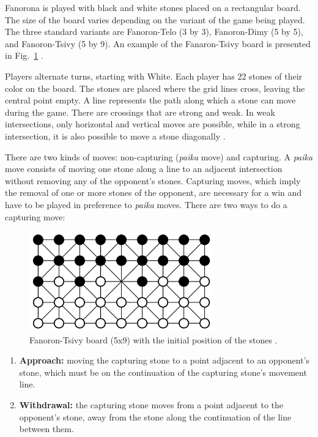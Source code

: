\documentclass[journal]{IEEEtran}
\begin{document}

Fanorona is played with black and white stones placed on a rectangular board. The size of the board varies depending on the variant of the game being played. The three standard variants are Fanoron-Telo (3 by 3), Fanoron-Dimy (5 by 5), and Fanoron-Tsivy (5 by 9). An example of the Fanaron-Tsivy board is presented in Fig.~\ref{fig:9x5Fano} \cite{walker2014book}. 

Players alternate turns, starting with White. Each player has 22 stones of their color on the board. The stones are placed where the grid lines cross, leaving the central point empty. A line represents the path along which a stone can move during the game. There are crossings that are strong and weak. In weak intersections, only horizontal and vertical moves are possible, while in a strong intersection, it is also possible to move a stone diagonally \cite{walker2014book, Schadd2008}. 

There are two kinds of moves: non-capturing (\emph{paika} move) and capturing. A \emph{paika} move consists of moving one stone along a line to an adjacent intersection without removing any of the opponent's stones.
Capturing moves, which imply the removal of one or more stones of the opponent, are necessary for a win and have to be played in preference to \emph{paika} moves. There are two ways to do a capturing move: 

\begin{figure}[h]
    \includegraphics[width = 8cm]{Fanorona9x5}
    \centering
    \caption{Fanoron-Tsivy board (5x9) with the initial position of the stones \cite{Schadd2008}.}
    \label{fig:9x5Fano}
\end{figure}

\begin{enumerate}
    \item \textbf{Approach:} moving the capturing stone to a point adjacent to an opponent's stone, which must be on the continuation of the capturing stone's movement line.
    \item \textbf{Withdrawal:} the capturing stone moves from a point adjacent to the opponent's stone, away from the stone along the continuation of the line between them.
\end{enumerate}
\end{document}
